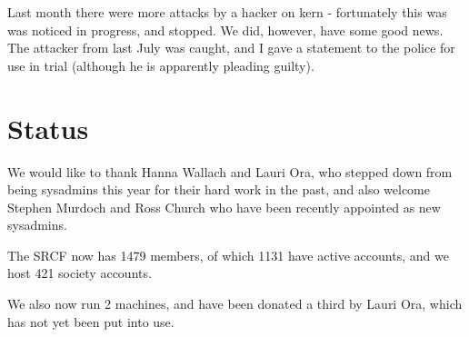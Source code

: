 \documentclass[a4paper, 12pt]{report}
\begin{document}
Last month there were more attacks by a hacker on kern - fortunately this was was noticed in progress, and stopped. We did, however, have some good news. The attacker from last July was caught, and I gave a statement to the police for use in trial (although he is apparently pleading guilty).

\section{Status}

We would like to thank Hanna Wallach and Lauri Ora, who stepped down from being sysadmins this year for their hard work in the past, and also welcome Stephen Murdoch and Ross Church who have been recently appointed as new sysadmins.

The SRCF now has 1479 members, of which 1131 have active accounts, and we host 421 society accounts.

We also now run 2 machines, and have been donated a third by Lauri Ora, which has not yet been put into use.
\end{document}
